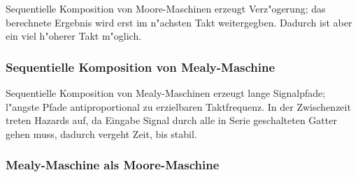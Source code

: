 \documentclass[german, 10pt, a4paper, twocolumn]{scrartcl}
\theoremstyle{definition}
\begin{document}
Sequentielle Komposition von Moore-Maschinen erzeugt Verz"ogerung; das berechnete Ergebnis wird erst im n"achsten Takt weitergegben. Dadurch ist aber ein viel h"oherer Takt m"oglich. 

\subsubsection{Sequentielle Komposition von Mealy-Maschine}

Sequentielle Komposition von Mealy-Maschinen erzeugt lange Signalpfade; l"angste Pfade antiproportional zu erzielbaren Taktfrequenz. In der Zwischenzeit treten Hazards auf, da Eingabe Signal durch alle in Serie geschalteten Gatter gehen muss, dadurch vergeht Zeit, bis stabil.

\subsubsection{Mealy-Maschine als Moore-Maschine}
\end{document}
